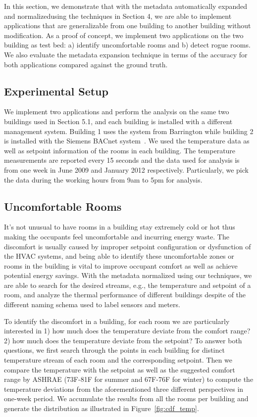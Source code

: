 In this section, we demonstrate that with the metadata automatically expanded and normalizedusing the techniques in Section 4, we are able to implement applications that are generalizable from one building to another building without modification. As a proof of concept, we implement two applications on the two building as test bed: a) identify uncomfortable rooms and b) detect rogue rooms. We also evaluate the metadata expansion technique in terms of the accuracy for both applications compared against the ground truth. 

\subsection{Experimental Setup}
We implement two applications and perform the analysis on the same two buildings used in Section 5.1, and each building is installed with a different management system. Building 1 uses the system from Barrington while building 2 is installed with the Siemens BACnet system~\cite{bacnet}. We used the temperature data as well as setpoint information of the rooms in each building. The temperature measurements are reported every 15 seconds and the data used for analysis is from one week in June 2009 and January 2012 respectively. Particularly, we pick the data during the working hours from 9am to 5pm for analysis.

\subsection{Uncomfortable Rooms}
It's not unusual to have rooms in a building stay extremely cold or hot thus making the occupants feel uncomfortable and incurring energy waste. The discomfort is usually caused by improper setpoint configuration or dysfunction of the HVAC systems, and being able to identify these uncomfortable zones or rooms in the building is vital to improve occupant comfort as well as achieve potential energy savings. With the metadata normalized using our techniques, we are able to search for the desired streams, e.g., the temperature and setpoint of a room, and analyze the thermal performance of different buildings despite of the different naming schema used to label sensors and meters.

To identify the discomfort in a building, for each room we are particularly interested in 1) how much does the temperature deviate from the comfort range? 2) how much does the temperature deviate from the setpoint? To answer both questions, we first search through the points in each building for distinct temperature stream of each room and the corresponding setpoint. Then we compare the temperature with the setpoint as well as the suggested comfort range by ASHRAE (73F-81F for summer and 67F-76F for winter) to compute the temperature deviations from the aforementioned three different perspectives in one-week period. We accumulate the results from all the rooms per building and generate the distribution as illustrated in Figure~\ref{fig:cdf_temp}.

